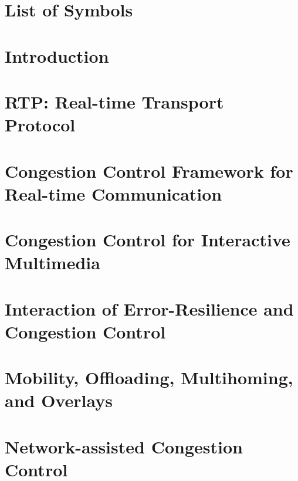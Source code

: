 \documentclass[dissertation,final]{aaltoseries} %
\begin{document}
\chapter*{List of Symbols}


\chapter{Introduction}
\label{chap1}


% 

\chapter{RTP: Real-time Transport Protocol}
\label{chap:rtp}


\chapter{Congestion Control Framework for Real-time Communication}
\label{chap:cc.fw}


\chapter{Congestion Control for Interactive Multimedia}
\label{chap:cc}


 \chapter{Interaction of Error-Resilience and Congestion Control}
 \label{chap:er-cc}


\chapter{Mobility, Offloading, Multihoming, and Overlays}
\label{chap:mprtp}


 \chapter{Network-assisted Congestion Control}
 \label{chap:cc.nw}
 
\end{document}
